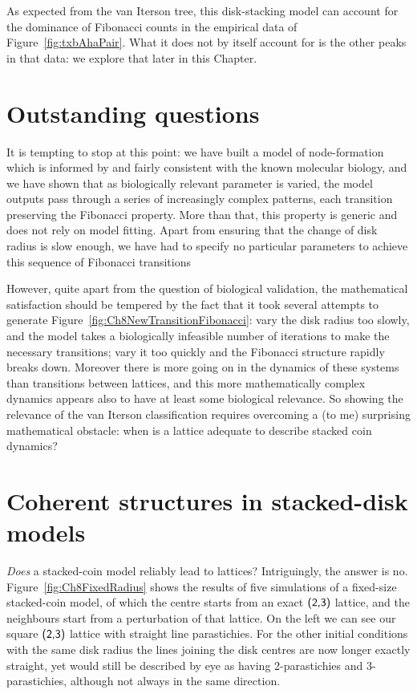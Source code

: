 As expected from the van Iterson tree, this disk-stacking model can account for the dominance of Fibonacci counts in the empirical data of Figure~\ref{fig:txbAhaPair}.  What it does not by itself account for is the other peaks in that data: we explore that later in this Chapter.

\clearpage
\section{Outstanding questions} 


It is tempting to stop at this point: we have built a model of node-formation which is informed by and fairly consistent with the known molecular biology, and we have shown that as biologically relevant parameter is varied, the model outputs pass through a series of increasingly complex patterns, each transition preserving the Fibonacci property. More than that, this property is generic and does not rely on model fitting. Apart from ensuring that the change of disk radius is slow enough, we have had to specify no particular parameters to achieve this sequence of Fibonacci transitions

However, quite apart from the question of biological validation, the mathematical satisfaction should be tempered by the fact that it took several attempts to generate Figure~\ref{fig:Ch8NewTransitionFibonacci}: vary the disk radius too slowly, and the model takes a biologically infeasible number of iterations to make the necessary transitions; vary it too quickly and the Fibonacci structure rapidly breaks down. 
Moreover there is more going on in the dynamics of these systems than transitions between lattices, and this more mathematically complex dynamics appears also to have at least some biological relevance.  So showing the   relevance of the van Iterson classification requires overcoming  a (to me) surprising mathematical obstacle: when is a lattice  adequate to describe stacked coin dynamics?

\clearpage
\section{Coherent structures in stacked-disk models}

\textit{Does} a stacked-coin model reliably lead to lattices? Intriguingly, the answer is no. 
Figure~\ref{fig:Ch8FixedRadius} shows the results of five simulations of a fixed-size stacked-coin model, of which the centre starts from an exact $\textsf{(2,3)}$ lattice, and the neighbours start from a perturbation of that lattice.
On the left we can see our square $\textsf{(2,3)}$ lattice with straight line parastichies. For the other initial conditions with the same disk radius the lines joining the disk centres are now longer exactly straight, yet would still be described by eye as having 2-parastichies and 3-parastichies, although not always in the same direction.

